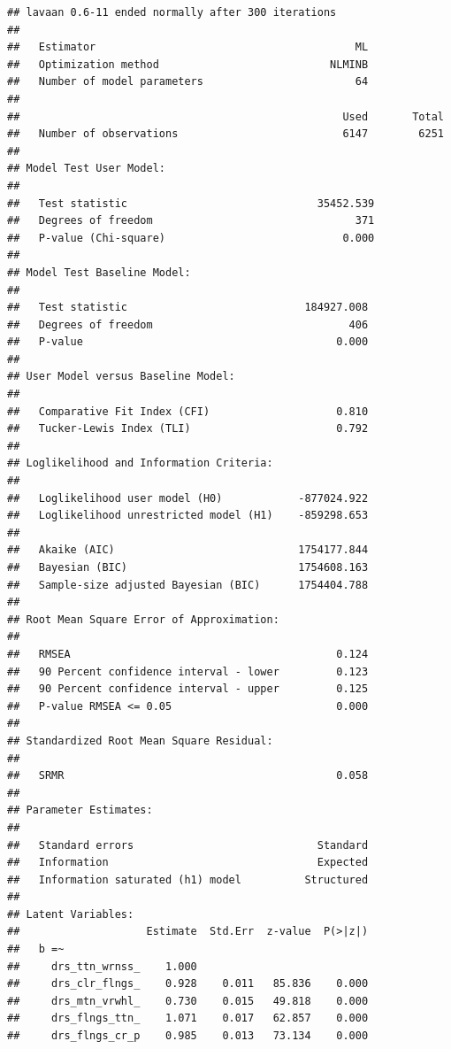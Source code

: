 \documentclass[
]{book}
\begin{document}
\begin{verbatim}
## lavaan 0.6-11 ended normally after 300 iterations
## 
##   Estimator                                         ML
##   Optimization method                           NLMINB
##   Number of model parameters                        64
##                                                       
##                                                   Used       Total
##   Number of observations                          6147        6251
##                                                                   
## Model Test User Model:
##                                                        
##   Test statistic                              35452.539
##   Degrees of freedom                                371
##   P-value (Chi-square)                            0.000
## 
## Model Test Baseline Model:
## 
##   Test statistic                            184927.008
##   Degrees of freedom                               406
##   P-value                                        0.000
## 
## User Model versus Baseline Model:
## 
##   Comparative Fit Index (CFI)                    0.810
##   Tucker-Lewis Index (TLI)                       0.792
## 
## Loglikelihood and Information Criteria:
## 
##   Loglikelihood user model (H0)            -877024.922
##   Loglikelihood unrestricted model (H1)    -859298.653
##                                                       
##   Akaike (AIC)                             1754177.844
##   Bayesian (BIC)                           1754608.163
##   Sample-size adjusted Bayesian (BIC)      1754404.788
## 
## Root Mean Square Error of Approximation:
## 
##   RMSEA                                          0.124
##   90 Percent confidence interval - lower         0.123
##   90 Percent confidence interval - upper         0.125
##   P-value RMSEA <= 0.05                          0.000
## 
## Standardized Root Mean Square Residual:
## 
##   SRMR                                           0.058
## 
## Parameter Estimates:
## 
##   Standard errors                             Standard
##   Information                                 Expected
##   Information saturated (h1) model          Structured
## 
## Latent Variables:
##                    Estimate  Std.Err  z-value  P(>|z|)
##   b =~                                                
##     drs_ttn_wrnss_    1.000                           
##     drs_clr_flngs_    0.928    0.011   85.836    0.000
##     drs_mtn_vrwhl_    0.730    0.015   49.818    0.000
##     drs_flngs_ttn_    1.071    0.017   62.857    0.000
##     drs_flngs_cr_p    0.985    0.013   73.134    0.000

\end{verbatim}
\end{document}
